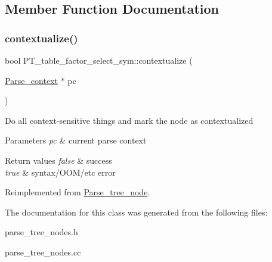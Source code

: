 \subsection{Member Function Documentation}
\mbox{\label{classPT__table__factor__select__sym_ab5e84e7a041385c3530b28b529b6b915}} 
\subsubsection{\texorpdfstring{contextualize()}{contextualize()}}
{\footnotesize\ttfamily bool P\+T\+\_\+table\+\_\+factor\+\_\+select\+\_\+sym\+::contextualize (\begin{DoxyParamCaption}\item[{\mbox{\hyperlink{structParse__context}{Parse\+\_\+context}} $\ast$}]{pc }\end{DoxyParamCaption})\hspace{0.3cm}{\ttfamily [virtual]}}

Do all context-\/sensitive things and mark the node as contextualized


\begin{DoxyParams}{Parameters}
{\em pc} & current parse context\\
\hline
\end{DoxyParams}

\begin{DoxyRetVals}{Return values}
{\em false} & success \\
\hline
{\em true} & syntax/\+O\+O\+M/etc error \\
\hline
\end{DoxyRetVals}


Reimplemented from \mbox{\hyperlink{classParse__tree__node_a22d93524a537d0df652d7efa144f23da}{Parse\+\_\+tree\+\_\+node}}.



The documentation for this class was generated from the following files\+:\begin{DoxyCompactItemize}
\item 
parse\+\_\+tree\+\_\+nodes.\+h\item 
parse\+\_\+tree\+\_\+nodes.\+cc\end{DoxyCompactItemize}
